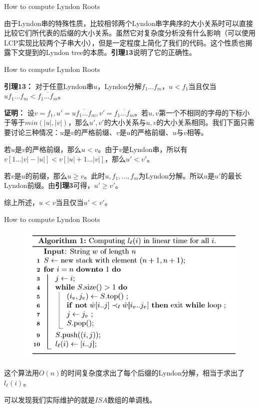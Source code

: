 \documentclass{beamer}
\begin{document}
\begin{frame}{How to compute Lyndon Roots}
	\par 由于Lyndon串的特殊性质，比较相邻两个Lyndon串字典序的大小关系时可以直接比较它们所代表的后缀的大小关系。虽然它对复杂度分析没有什么影响（可以使用LCP实现比较两个子串大小），但是一定程度上简化了我们的代码。这个性质也揭露下文提到的Lyndon tree的本质。\textbf{引理13}说明了它的正确性。
\end{frame}

\begin{frame}{How to compute Lyndon Roots}
	\par \textbf{引理13：} 对于任意Lyndon串$u$，Lyndon分解$f_1...f_m$，$u<f_1$当且仅当$\overline{u f_1...f_m}<\overline{f_1...f_m}$。
	\pause
	\par \textbf{证明：} 设$v = f_1, u' = \overline{u f_1...f_m}, v' = \overline{f_1...f_m}$。若$u, v$第一个不相同的字母的下标小于等于$min(|u|, |v|)$，那么$u',v'$的大小关系与$u, v$的大小关系相同。我们下面只需要讨论三种情况：$u$是$v$的严格前缀、$v$是$u$的严格前缀、$u$与$v$相等。
	\pause
	\par 若$u$是$v$的严格前缀，那么$u<v$。由于$v$是Lyndon串，所以有$v[1...|v|-|u|]<v[|u|+1...|v|]$，那么$u'<v'$。
	\pause
	\par 若$v$是$u$的前缀，那么$u \ge v$。此时$u, f_1, ... , f_m$为Lyndon分解。所以$u$是$u'$的最长Lyndon前缀。由\textbf{引理3}可得，$u' \ge v'$。
	\pause
	\par 综上所述，$u<v$当且仅当$u'<v'$。
\end{frame}

\begin{frame}{How to compute Lyndon Roots}

\begin{figure}[h]%
	\centering  
	\includegraphics[width=0.7\linewidth]{figures/algorithm.png}
\end{figure}
	\pause
	\par 这个算法用$O(n)$的时间复杂度求出了每个后缀的Lyndon分解，相当于求出了$l_{\ell}(i)$。
	\pause
	\par 可以发现我们实际维护的就是$ISA$数组的单调栈。
\end{frame}
\end{document}
